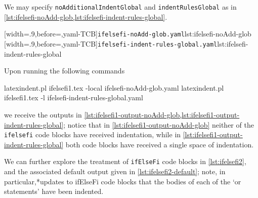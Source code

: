  \begin{example}
 We may specify \texttt{noAdditionalIndentGlobal} and \texttt{indentRulesGlobal} as in
 \cref{lst:ifelsefi-noAdd-glob,lst:ifelsefi-indent-rules-global}.

 \begin{cmhtcbraster}
  [width=.9\linewidth,before=\centering,yaml-TCB]{\texttt{ifelsefi-noAdd-glob.yaml}}{lst:ifelsefi-noAdd-glob}
  [width=.9\linewidth,before=\centering,yaml-TCB]{\texttt{ifelsefi-indent-rules-global.yaml}}{lst:ifelsefi-indent-rules-global}
 \end{cmhtcbraster}

 Upon running the following commands 
 \begin{commandshell}
latexindent.pl ifelsefi1.tex -local ifelsefi-noAdd-glob.yaml  
latexindent.pl ifelsefi1.tex -l ifelsefi-indent-rules-global.yaml  
\end{commandshell}
 we receive the outputs in
 \cref{lst:ifelsefi1-output-noAdd-glob,lst:ifelsefi1-output-indent-rules-global}; notice
 that in \cref{lst:ifelsefi1-output-noAdd-glob} neither of the \texttt{ifelsefi} code
 blocks have received indentation, while in
 \cref{lst:ifelsefi1-output-indent-rules-global} both code blocks have received a single
 space of indentation.

 \begin{cmhtcbraster}
 \end{cmhtcbraster}
 \end{example}

 \begin{example}
 We can further explore the treatment of \texttt{ifElseFi} code blocks in
 \cref{lst:ifelsefi2}, and the associated default output given in
 \cref{lst:ifelsefi2-default}; note, in particular,*{updates to
 ifElseFi code blocks} that the bodies of each of the `or statements' have been indented.%

 \begin{cmhtcbraster}[raster column skip=.1\linewidth]
 \end{cmhtcbraster}
 \end{example}
